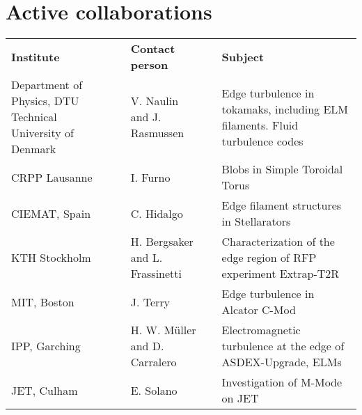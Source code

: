 \section{Active collaborations}
\begin{longtable}{p{}p{} p{}p{} p{}}
\textbf{Institute} &\phantom{ab} &  \textbf{Contact person} &\phantom{ab} &  \textbf{Subject} \\
Department of Physics, DTU Technical University of Denmark &
\phantom{ab} & V. Naulin and J. Rasmussen &\phantom{ab} &  Edge
turbulence in tokamaks, including ELM filaments. Fluid turbulence codes  \\
CRPP Lausanne & \phantom{ab} & I. Furno &\phantom{ab} &  Blobs in Simple Toroidal
Torus \\
CIEMAT, Spain &\phantom{ab} &  C. Hidalgo &\phantom{ab} &  Edge filament structures
in Stellarators \\
KTH Stockholm &\phantom{ab} &  H. Bergsaker and L. Frassinetti &\phantom{ab} &  Characterization of
the edge region of RFP experiment Extrap-T2R \\
MIT, Boston &\phantom{ab} &  J. Terry &\phantom{ab} &  Edge turbulence in Alcator C-Mod \\
IPP, Garching &\phantom{ab} &  H. W. M\"uller and D. Carralero &\phantom{ab} &  Electromagnetic turbulence at the
edge of ASDEX-Upgrade, ELMs \\
JET,  Culham &\phantom{ab} &  E. Solano &\phantom{ab} &  Investigation of M-Mode on JET

\end{longtable}
